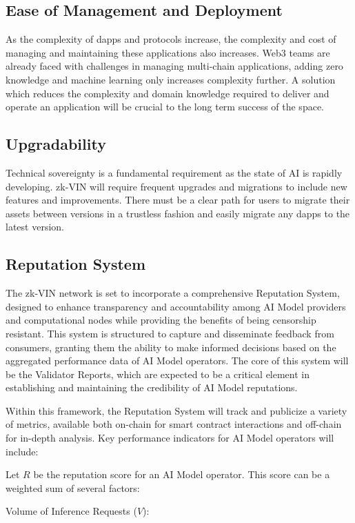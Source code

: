 \documentclass[conference]{IEEEtran}
\begin{document}
\subsection{Ease of Management and Deployment}
As the complexity of dapps and protocols increase, the complexity and cost of managing and maintaining these applications also increases. Web3 teams are already faced with challenges in managing multi-chain applications, adding zero knowledge and machine learning only increases complexity further. A solution which reduces the complexity and domain knowledge required to deliver and operate an application will be crucial to the long term success of the space.

\subsection{Upgradability}
Technical sovereignty is a fundamental requirement as the state of AI is rapidly developing. zk-VIN will require frequent upgrades and migrations to include new features and improvements. There must be a clear path for users to migrate their assets between versions in a trustless fashion and easily migrate any dapps to the latest version.

\subsection{Reputation System}
The zk-VIN network is set to incorporate a comprehensive Reputation System, designed to enhance transparency and accountability among AI Model providers and computational nodes while providing the benefits of being censorship resistant. This system is structured to capture and disseminate feedback from consumers, granting them the ability to make informed decisions based on the aggregated performance data of AI Model operators. The core of this system will be the Validator Reports, which are expected to be a critical element in establishing and maintaining the credibility of AI Model reputations.

Within this framework, the Reputation System will track and publicize a variety of metrics, available both on-chain for smart contract interactions and off-chain for in-depth analysis. Key performance indicators for AI Model operators will include:

Let $R$ be the reputation score for an AI Model operator. This score can be a weighted sum of several factors:

Volume of Inference Requests ($V$):
\end{document}

